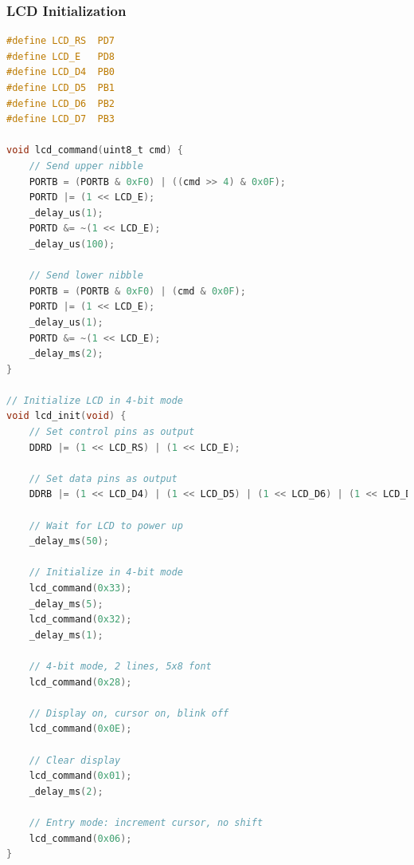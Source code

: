 \documentclass{article}
\begin{document}
\subsubsection{LCD Initialization}
\begin{lstlisting}[language=C]
#define LCD_RS  PD7
#define LCD_E   PD8
#define LCD_D4  PB0
#define LCD_D5  PB1
#define LCD_D6  PB2
#define LCD_D7  PB3

void lcd_command(uint8_t cmd) {
    // Send upper nibble
    PORTB = (PORTB & 0xF0) | ((cmd >> 4) & 0x0F);
    PORTD |= (1 << LCD_E);
    _delay_us(1);
    PORTD &= ~(1 << LCD_E);
    _delay_us(100);
    
    // Send lower nibble
    PORTB = (PORTB & 0xF0) | (cmd & 0x0F);
    PORTD |= (1 << LCD_E);
    _delay_us(1);
    PORTD &= ~(1 << LCD_E);
    _delay_ms(2);
}

// Initialize LCD in 4-bit mode
void lcd_init(void) {
    // Set control pins as output
    DDRD |= (1 << LCD_RS) | (1 << LCD_E);
    
    // Set data pins as output
    DDRB |= (1 << LCD_D4) | (1 << LCD_D5) | (1 << LCD_D6) | (1 << LCD_D7);
    
    // Wait for LCD to power up
    _delay_ms(50);
    
    // Initialize in 4-bit mode
    lcd_command(0x33);
    _delay_ms(5);
    lcd_command(0x32);
    _delay_ms(1);
    
    // 4-bit mode, 2 lines, 5x8 font
    lcd_command(0x28);
    
    // Display on, cursor on, blink off
    lcd_command(0x0E);
    
    // Clear display
    lcd_command(0x01);
    _delay_ms(2);
    
    // Entry mode: increment cursor, no shift
    lcd_command(0x06);
}
\end{lstlisting}
\end{document}
